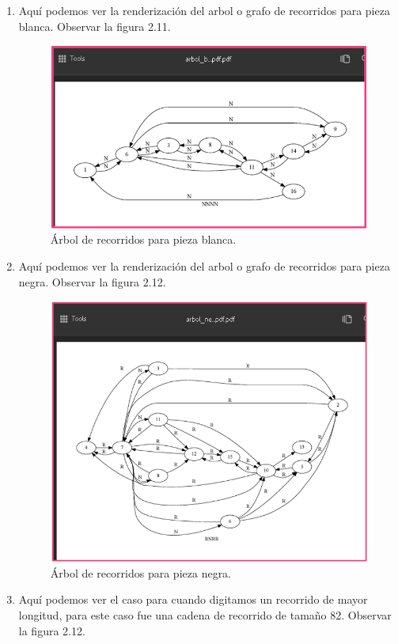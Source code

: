 \begin{enumerate}
\newpage
\item Aquí podemos ver la renderización del arbol o grafo de recorridos para pieza blanca.  Observar la figura 2.11.

\begin{figure}[h]
\begin{minipage}{0.3\textwidth}
    \includegraphics[width=4\linewidth]{Images/Cap12.png}
\end{minipage}
\caption{Árbol de recorridos para pieza blanca.}
\label{fig:imagen}
\end{figure}

\newpage
\item Aquí podemos ver la renderización del arbol o grafo de recorridos para pieza negra. Observar la figura 2.12.

\begin{figure}[h]
\begin{minipage}{0.3\textwidth}
    \includegraphics[width=4\linewidth]{Images/Cap13.png}
\end{minipage}
\caption{Árbol de recorridos para pieza negra.}
\label{fig:imagen}
\end{figure}
\newpage
\item Aquí podemos ver el caso para cuando digitamos un recorrido de mayor longitud, para este caso fue una cadena de recorrido de tamaño 82. Observar la figura 2.12.


\end{enumerate}
